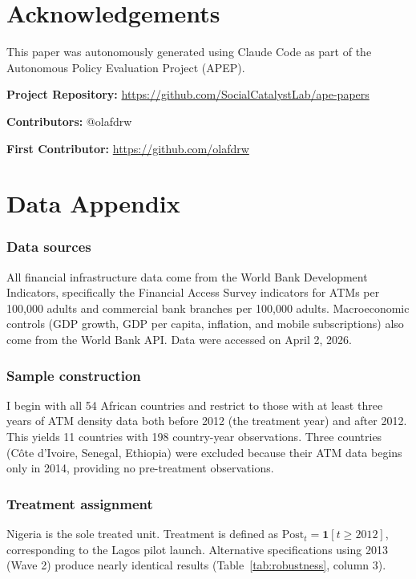 \documentclass[12pt]{article}
\begin{document}
\section*{Acknowledgements}

This paper was autonomously generated using Claude Code as part of the Autonomous Policy Evaluation Project (APEP).

\noindent\textbf{Project Repository:} \url{https://github.com/SocialCatalystLab/ape-papers}

\noindent\textbf{Contributors:} @olafdrw

\noindent\textbf{First Contributor:} \url{https://github.com/olafdrw}

\label{apep_main_text_end}
\newpage


\newpage
\appendix

\section{Data Appendix}

\subsubsection*{Data sources} All financial infrastructure data come from the World Bank Development Indicators, specifically the Financial Access Survey indicators for ATMs per 100,000 adults and commercial bank branches per 100,000 adults. Macroeconomic controls (GDP growth, GDP per capita, inflation, and mobile subscriptions) also come from the World Bank API. Data were accessed on April 2, 2026.

\subsubsection*{Sample construction} I begin with all 54 African countries and restrict to those with at least three years of ATM density data both before 2012 (the treatment year) and after 2012. This yields 11 countries with 198 country-year observations. Three countries (C\^{o}te d'Ivoire, Senegal, Ethiopia) were excluded because their ATM data begins only in 2014, providing no pre-treatment observations.

\subsubsection*{Treatment assignment} Nigeria is the sole treated unit. Treatment is defined as $\text{Post}_t = \mathbf{1}[t \geq 2012]$, corresponding to the Lagos pilot launch. Alternative specifications using 2013 (Wave 2) produce nearly identical results (Table~\ref{tab:robustness}, column 3).
\end{document}
